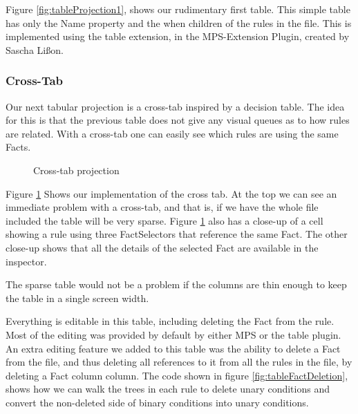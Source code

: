 Figure \ref{fig:tableProjection1}, shows our rudimentary first table.
This simple table has only the Name property and the when children of the rules in the file.
This is implemented using the table extension, in the MPS-Extension Plugin, created by Sascha Lißon.

\subsubsection{Cross-Tab}
Our next tabular projection is a cross-tab inspired by a decision table.
The idea for this is that the previous table does not give any visual queues as to how rules are related.
With a cross-tab one can easily see which rules are using the same Facts.

\begin{figure}[h]
    \centering
    \caption{Cross-tab projection}
    \label{fig:crosstabProjection1}
\end{figure}

Figure \ref{fig:crosstabProjection1} Shows our implementation of the cross tab.
At the top we can see an immediate problem with a cross-tab, and that is, if we have the whole file included the table will be very sparse.
Figure \ref{fig:crosstabProjection1} also has a close-up of a cell showing a rule using three FactSelectors that reference the same Fact.
The other close-up shows that all the details of the selected Fact are available in the inspector.

The sparse table would not be a problem if the columns are thin enough to keep the table in a single screen width.

Everything is editable in this table, including deleting the Fact from the rule.
Most of the editing was provided by default by either MPS or the table plugin.
An extra editing feature we added to this table was the ability to delete a Fact from the file, and thus deleting all references to it from all the rules in the file, by deleting a Fact column column.
The code shown in figure \ref{fig:tableFactDeletion}, shows how we can walk the trees in each rule to delete unary conditions and convert the non-deleted side of binary conditions into unary conditions.


